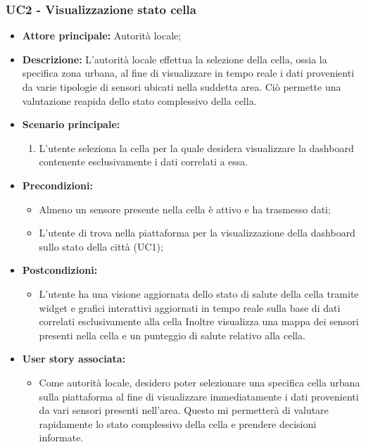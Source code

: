 \documentclass{article}
\begin{document}
\subsubsection{UC2 - Visualizzazione stato cella}
\begin{itemize}
    \item \textbf{Attore principale:} Autorità locale;
    \item \textbf{Descrizione:} L'autorità locale effettua la selezione della cella, ossia la specifica zona urbana, al fine di visualizzare in tempo reale i dati provenienti da varie tipologie di sensori ubicati nella suddetta area. Ciò permette una valutazione reapida dello stato complessivo della cella.
    \item \textbf{Scenario principale:}
          \begin{enumerate}
              \item L'utente seleziona la cella per la quale desidera visualizzare la dashboard contenente esclusivamente i dati correlati a essa.
          \end{enumerate}
    \item \textbf{Precondizioni:}
          \begin{itemize}
              \item  Almeno un sensore presente nella cella è attivo e ha trasmesso dati;
              \item L'utente di trova  nella piattaforma per la visualizzazione della dashboard sullo stato della città (UC1);
          \end{itemize}
    \item \textbf{Postcondizioni:}
          \begin{itemize}
              \item  L'utente ha una visione aggiornata dello stato di salute della cella tramite widget e grafici interattivi aggiornati in tempo reale sulla base di dati correlati esclusivamente alla cella
                    Inoltre visualizza una mappa dei sensori presenti nella cella e un punteggio di salute relativo alla cella.
          \end{itemize}
    \item \textbf{User story associata:}
          \begin{itemize}
              \item Come autorità locale, desidero poter selezionare una specifica cella urbana sulla piattaforma al fine di visualizzare immediatamente i dati provenienti da vari sensori presenti nell'area. Questo mi permetterà di valutare rapidamente lo stato complessivo della cella e prendere decisioni informate.
          \end{itemize}
\end{itemize}
\end{document}
